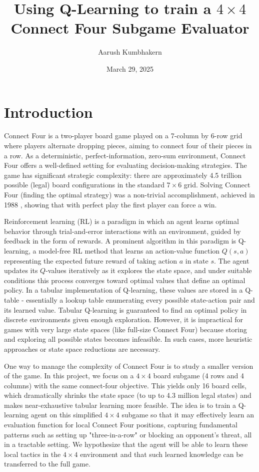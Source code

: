\documentclass[10pt]{extarticle}
\title{Using Q-Learning to train a $4 \times 4$ Connect Four Subgame Evaluator}
\author{Aarush Kumbhakern}
\date{March 29, 2025}
\begin{document}
\sloppy
\maketitle

\section{Introduction}

Connect Four is a two-player board game played on a 7-column by 6-row grid where players alternate dropping pieces, aiming to connect four of their pieces in a row. As a deterministic, perfect-information, zero-sum environment, Connect Four offers a well-defined setting for evaluating decision-making strategies. The game has significant strategic complexity: there are approximately 4.5 trillion possible (legal) board configurations in the standard $7 \times 6$ grid. Solving Connect Four (finding the optimal strategy) was a non-trivial accomplishment, achieved in 1988 \cite{Wiki2025}, showing that with perfect play the first player can force a win.

Reinforcement learning (RL) is a paradigm in which an agent learns optimal behavior through trial-and-error interactions with an environment, guided by feedback in the form of rewards. A prominent algorithm in this paradigm is Q-learning, a model-free RL method that learns an action-value function $Q(s,a)$ representing the expected future reward of taking action $a$ in state $s$. The agent updates its $Q$-values iteratively as it explores the state space, and under suitable conditions this process converges toward optimal values that define an optimal policy. In a tabular implementation of Q-learning, these values are stored in a Q-table - essentially a lookup table enumerating every possible state-action pair and its learned value. Tabular Q-learning is guaranteed to find an optimal policy in discrete environments given enough exploration. However, it is impractical for games with very large state spaces (like full-size Connect Four) because storing and exploring all possible states becomes infeasible. In such cases, more heuristic approaches or state space reductions are necessary.

One way to manage the complexity of Connect Four is to study a smaller version of the game. In this project, we focus on a $4 \times 4$ board subgame (4 rows and 4 columns) with the same connect-four objective. This yields only 16 board cells, which dramatically shrinks the state space (to up to 4.3 million legal states) and makes near-exhaustive tabular learning more feasible. The idea is to train a Q-learning agent on this simplified $4 \times 4$ subgame so that it may effectively learn an evaluation function for local Connect Four positions, capturing fundamental patterns such as setting up "three-in-a-row" or blocking an opponent's threat, all in a tractable setting. We hypothesize that the agent will be able to learn these local tactics in the $4 \times 4$ environment and that such learned knowledge can be transferred to the full game.
\end{document}
